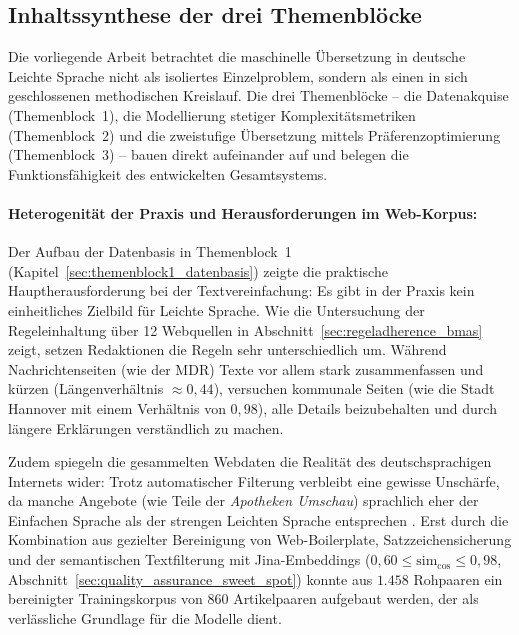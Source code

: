 \subsection{Inhaltssynthese der drei Themenblöcke}
\label{sec:diskussion_synthese}

Die vorliegende Arbeit betrachtet die maschinelle Übersetzung in deutsche Leichte Sprache nicht als isoliertes Einzelproblem, sondern als einen in sich geschlossenen methodischen Kreislauf. Die drei Themenblöcke – die Datenakquise (Themenblock~1), die Modellierung stetiger Komplexitätsmetriken (Themenblock~2) und die zweistufige Übersetzung mittels Präferenzoptimierung (Themenblock~3) – bauen direkt aufeinander auf und belegen die Funktionsfähigkeit des entwickelten Gesamtsystems.

\paragraph{Heterogenität der Praxis und Herausforderungen im Web-Korpus:}
Der Aufbau der Datenbasis in Themenblock~1 (Kapitel~\ref{sec:themenblock1_datenbasis}) zeigte die praktische Hauptherausforderung bei der Textvereinfachung: Es gibt in der Praxis kein einheitliches Zielbild für Leichte Sprache. Wie die Untersuchung der Regeleinhaltung über 12 Webquellen in Abschnitt~\ref{sec:regeladherence_bmas} zeigt, setzen Redaktionen die Regeln sehr unterschiedlich um. Während Nachrichtenseiten (wie der MDR) Texte vor allem stark zusammenfassen und kürzen (Längenverhältnis $\approx 0{,}44$), versuchen kommunale Seiten (wie die Stadt Hannover mit einem Verhältnis von $0{,}98$), alle Details beizubehalten und durch längere Erklärungen verständlich zu machen.

Zudem spiegeln die gesammelten Webdaten die Realität des deutschsprachigen Internets wider: Trotz automatischer Filterung verbleibt eine gewisse Unschärfe, da manche Angebote (wie Teile der \textit{Apotheken Umschau}) sprachlich eher der Einfachen Sprache als der strengen Leichten Sprache entsprechen \citep{toborek2023new}. Erst durch die Kombination aus gezielter Bereinigung von Web-Boilerplate, Satzzeichensicherung und der semantischen Textfilterung mit Jina-Embeddings ($0{,}60 \le \text{sim}_{\cos} \le 0{,}98$, Abschnitt~\ref{sec:quality_assurance_sweet_spot}) konnte aus $1.458$ Rohpaaren ein bereinigter Trainingskorpus von $860$ Artikelpaaren aufgebaut werden, der als verlässliche Grundlage für die Modelle dient.

